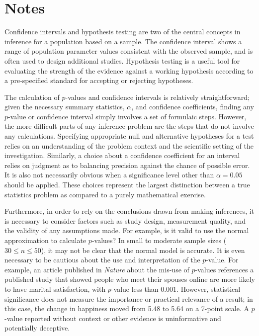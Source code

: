 \section{Notes}
\label{ch4Summary}

Confidence intervals and hypothesis testing are two of the central concepts in inference for a population based on a sample. The confidence interval shows a range of population parameter values consistent with the observed sample, and is often used to design additional studies. Hypothesis testing is a useful tool for evaluating the strength of the evidence against a working hypothesis according to a pre-specified standard for accepting or rejecting hypotheses.

The calculation of $p$-values and confidence intervals is relatively straightforward; given the necessary summary statistics, $\alpha$, and confidence coefficients, finding any $p$-value or confidence interval simply involves a set of formulaic steps. However, the more difficult parts of any inference problem are the steps that do not involve any calculations. Specifying appropriate null and alternative hypotheses for a test relies on an understanding of the problem context and the scientific setting of the investigation. Similarly, a choice about a confidence coefficient for an interval relies on judgment as to balancing precision against the chance of possible error. It is also not necessarily obvious when a significance level other than $\alpha = 0.05$ should be applied. These choices represent the largest distinction between a true statistics problem as compared to a purely mathematical exercise. 

Furthermore, in order to rely on the conclusions drawn from making inferences, it is necessary to consider factors such as study design, measurement quality, and the validity of any assumptions made. For example, is it valid to use the normal approximation to calculate $p$-values? In small to moderate sample sizes ($30 \leq n \leq 50$), it may not be clear that the normal model is accurate. It is even necessary to be cautious about the use and interpretation of the $p$-value. For example, an article published in \textit{Nature} about the mis-use of $p$-values references a published study that showed people who meet their spouses online are more likely to have marital satisfaction, with $p$-value less than 0.001. However, statistical significance does not measure the importance or practical relevance of a result; in this case, the change in happiness moved from 5.48 to 5.64 on a 7-point scale. A $p$-value reported without context or other evidence is uninformative and potentially deceptive.

